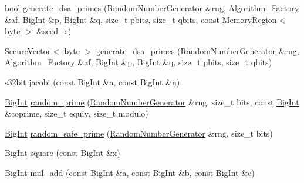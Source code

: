 \begin{DoxyCompactItemize}
\item 
bool \hyperlink{namespaceBotan_ad4cf1add3ca1ac0c669b69b5425a7eef}{generate\-\_\-dsa\-\_\-primes} (\hyperlink{classBotan_1_1RandomNumberGenerator}{Random\-Number\-Generator} \&rng, \hyperlink{classBotan_1_1Algorithm__Factory}{Algorithm\-\_\-\-Factory} \&af, \hyperlink{classBotan_1_1BigInt}{Big\-Int} \&p, \hyperlink{classBotan_1_1BigInt}{Big\-Int} \&q, size\-\_\-t pbits, size\-\_\-t qbits, const \hyperlink{classBotan_1_1MemoryRegion}{Memory\-Region}$<$ \hyperlink{namespaceBotan_a7d793989d801281df48c6b19616b8b84}{byte} $>$ \&seed\-\_\-c)
\item 
\hyperlink{classBotan_1_1SecureVector}{Secure\-Vector}$<$ \hyperlink{namespaceBotan_a7d793989d801281df48c6b19616b8b84}{byte} $>$ \hyperlink{namespaceBotan_ac7a08839ea58709edf10fca7af37e3d6}{generate\-\_\-dsa\-\_\-primes} (\hyperlink{classBotan_1_1RandomNumberGenerator}{Random\-Number\-Generator} \&rng, \hyperlink{classBotan_1_1Algorithm__Factory}{Algorithm\-\_\-\-Factory} \&af, \hyperlink{classBotan_1_1BigInt}{Big\-Int} \&p, \hyperlink{classBotan_1_1BigInt}{Big\-Int} \&q, size\-\_\-t pbits, size\-\_\-t qbits)
\item 
\hyperlink{namespaceBotan_a28e03d327abd4d5b1e7091e8d80d5cfe}{s32bit} \hyperlink{namespaceBotan_a8cbeeb8df9cdc171858edb15dd821d8b}{jacobi} (const \hyperlink{classBotan_1_1BigInt}{Big\-Int} \&a, const \hyperlink{classBotan_1_1BigInt}{Big\-Int} \&n)
\item 
\hyperlink{classBotan_1_1BigInt}{Big\-Int} \hyperlink{namespaceBotan_ad160e8df72dda63bdf50bcb01dcb1d41}{random\-\_\-prime} (\hyperlink{classBotan_1_1RandomNumberGenerator}{Random\-Number\-Generator} \&rng, size\-\_\-t bits, const \hyperlink{classBotan_1_1BigInt}{Big\-Int} \&coprime, size\-\_\-t equiv, size\-\_\-t modulo)
\item 
\hyperlink{classBotan_1_1BigInt}{Big\-Int} \hyperlink{namespaceBotan_a69ba7a20d4a290bba2d3742e97587e8c}{random\-\_\-safe\-\_\-prime} (\hyperlink{classBotan_1_1RandomNumberGenerator}{Random\-Number\-Generator} \&rng, size\-\_\-t bits)
\item 
\hyperlink{classBotan_1_1BigInt}{Big\-Int} \hyperlink{namespaceBotan_a56d5c2523fa616b1c70f0348065b3766}{square} (const \hyperlink{classBotan_1_1BigInt}{Big\-Int} \&x)
\item 
\hyperlink{classBotan_1_1BigInt}{Big\-Int} \hyperlink{namespaceBotan_a86e02df9fc09c870200d9b6ce44e5e9b}{mul\-\_\-add} (const \hyperlink{classBotan_1_1BigInt}{Big\-Int} \&a, const \hyperlink{classBotan_1_1BigInt}{Big\-Int} \&b, const \hyperlink{classBotan_1_1BigInt}{Big\-Int} \&c)

\end{DoxyCompactItemize}
